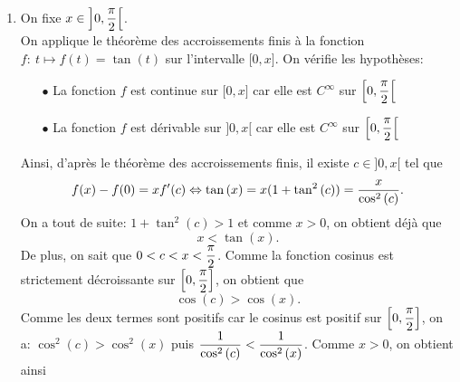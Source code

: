 \documentclass[a4paper, 11pt,reqno]{article}
\begin{document}
\begin{correction}
\begin{enumerate}
		      Ainsi, d'apr\`es le th\'eor\`eme des accroissements finis, il existe $c\in\rbrack 0,x\lbrack$ tel que
		      $$f(x)-f(0)=xf^{\prime}(c)\Leftrightarrow (1+x)^{\alpha}-1=\alpha x (1+c)^{\alpha-1}.$$
		      On encadre alors la d\'eriv\'ee $f^{\prime}(c)$ et on a: $0<c<x\Leftrightarrow 1<1+c<1+x$ donc en particulier on obtient que: $1+c>1$. De plus la fonction $t\mapsto t^{\alpha-1}$ est strictement croissante sur $\R^{+\star}$ car $\alpha>1$ (en effet cette fonction est d\'erivable et sa d\'eriv\'ee est la fonction: $t\mapsto (\alpha-1)t^{\alpha-2}$ qui est bien strictement positive sur $\R^{+\star}$ comme produit de deux termes strictement positifs car $\alpha>1$). On obtient donc que: $(1+t)^{\alpha-1}>1$ par composition par une fonction strictement croissante. Puis comme $\alpha x>0$, on obtient que: $\alpha x (1+c)^{\alpha-1}>\alpha x$. Ainsi, comme d'apr\`{e}s le th\'eor\`{e}me des accroissements finis on a: $(1+x)^{\alpha}-1=\alpha x (1+c)^{\alpha-1}$, on vient donc de montrer que:
		      $(1+x)^{\alpha}-1>\alpha x$ et ainsi on a bien que: 
		\item On fixe $x\in\left\rbrack 0,\displaystyle\frac{\pi}{2}\right\lbrack$.\\
		      \noindent On applique le th\'eor\`eme des accroissements finis \`a la fonction $f:\ t\mapsto f(t)=\tan{(t)}$ sur l'intervalle $\lbrack 0,x\rbrack$. On v\'erifie les hypoth\`eses:
		      \begin{itemize}
			      \item[$\bullet$] La fonction $f$ est continue sur $\lbrack 0,x\rbrack$ car elle est $C^{\infty}$ sur $\left\lbrack 0,\displaystyle\frac{\pi}{2}\right\lbrack$
			      \item[$\bullet$]  La fonction $f$ est d\'erivable sur $\rbrack 0,x\lbrack$ car elle est $C^{\infty}$ sur $\left\lbrack 0,\displaystyle\frac{\pi}{2}\right\lbrack$
		      \end{itemize}
		      Ainsi, d'apr\`es le th\'eor\`eme des accroissements finis, il existe $c\in\rbrack 0,x\lbrack$ tel que
		      $$f(x)-f(0)=xf^{\prime}(c)\Leftrightarrow \tan{(x)}=x(1+\tan^2{(c)})=\displaystyle\frac{x}{\cos^2{(c)}}.$$
		      On a tout de suite: $1+\tan^2{(c)}> 1$ et comme $x>0$, on obtient d\'ej\`a que
		      $$x<\tan{(x)}.$$
		      De plus, on sait que $0<c<x<\displaystyle\frac{\pi}{2}$. Comme la fonction cosinus est strictement d\'ecroissante sur $\left\lbrack 0,\displaystyle\frac{\pi}{2}\right\rbrack$, on obtient que
		      $$\cos{(c)}>\cos{(x)}.$$
		      Comme les deux termes sont positifs car le cosinus est positif sur $\left\lbrack 0,\displaystyle\frac{\pi}{2}\right\rbrack$, on a: $\cos^2{(c)}>\cos^2{(x)}$ puis $\displaystyle\frac{1}{\cos^2{(c)}}<\displaystyle\frac{1}{\cos^2{(x)}}$. Comme $x>0$, on obtient ainsi

\end{enumerate}
\end{correction}
\end{document}
